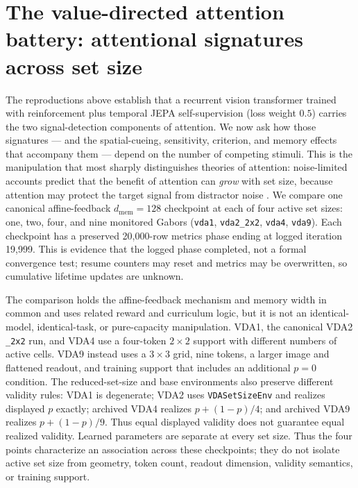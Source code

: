 \section{The value-directed attention battery: attentional signatures across set size}
\label{sec:vda-battery}

The reproductions above establish that a recurrent vision transformer trained
with reinforcement plus temporal JEPA self-supervision (loss weight $0.5$)
carries the two signal-detection components of attention. We now
ask how those signatures --- and the spatial-cueing, sensitivity, criterion, and
memory effects that accompany them --- depend on the number of competing stimuli.
This is the manipulation that most sharply distinguishes theories of attention:
noise-limited accounts predict that the benefit of attention can \emph{grow} with
set size, because attention may protect the target signal from distractor
noise \cite{carrasco2011_visual_attention_25y}. We compare one canonical affine-feedback
$d_{\mathrm{mem}}=128$ checkpoint at each of four active set sizes: one, two, four,
and nine monitored Gabors (\texttt{vda1}, \texttt{vda2\_2x2}, \texttt{vda4},
\texttt{vda9}). Each checkpoint has a preserved 20{,}000-row metrics phase ending
at logged iteration 19{,}999. This is evidence that the logged phase completed, not
a formal convergence test; resume counters may reset and metrics may be overwritten,
so cumulative lifetime updates are unknown.

The comparison holds the affine-feedback mechanism and memory width in common and uses
related reward and curriculum logic, but it is not an identical-model, identical-task,
or pure-capacity manipulation. VDA1, the canonical VDA2 \texttt{\_2x2} run, and VDA4 use a four-token
$2\times2$ support with different numbers of active cells. VDA9 instead uses a
$3\times3$ grid, nine tokens, a larger image and flattened readout, and training
support that includes an additional $p=0$ condition. The reduced-set-size and base
environments also preserve different validity rules: VDA1 is degenerate; VDA2 uses
\texttt{VDASetSizeEnv} and realizes displayed $p$ exactly; archived VDA4 realizes
$p+(1-p)/4$; and archived VDA9 realizes $p+(1-p)/9$. Thus equal displayed validity
does not guarantee equal realized validity. Learned parameters are separate
at every set size. Thus the four points characterize an association across these
checkpoints; they do not isolate active set size from geometry, token count, readout
dimension, validity semantics, or training support.

